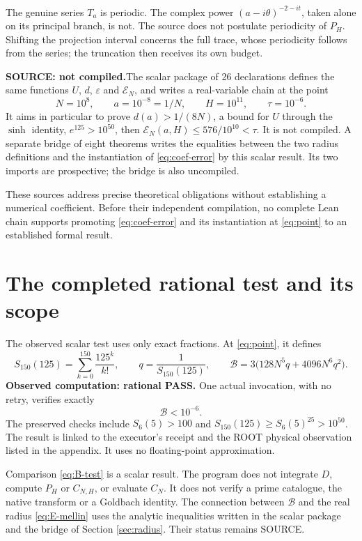 \documentclass[11pt,a4paper]{article}
\theoremstyle{remark}
\newcommand{\source}{\textbf{SOURCE: not compiled.}\space}
\begin{document}
The genuine series $T_a$ is periodic. The complex power
$(a-i\theta)^{-2-it}$, taken alone on its principal branch, is not.
The source does not postulate periodicity of $P_H$. Shifting the projection
interval concerns the full trace, whose periodicity follows from the series;
the truncation then receives its own budget.

\source The scalar package of 26 declarations defines the same functions
$U$, $d$, $\varepsilon$ and $\mathcal E_N$, and writes a real-variable
chain at the point
\begin{equation}\label{eq:point}
N=10^8,\qquad a=10^{-8}=1/N,\qquad H=10^{11},\qquad\tau=10^{-6}.
\end{equation}
It aims in particular to prove $d(a)>1/(8N)$, a bound for $U$ through the
$\sinh$ identity, $e^{125}>10^{50}$, then
$\mathcal E_N(a,H)\le576/10^{10}<\tau$.
It is not compiled. A separate bridge of eight theorems writes the equalities
between the two radius definitions and the instantiation of
\eqref{eq:coef-error} by this scalar result. Its two imports are prospective;
the bridge is also uncompiled.

These sources address precise theoretical obligations without establishing
a numerical coefficient. Before their independent compilation, no complete
Lean chain supports promoting \eqref{eq:coef-error} and its instantiation
at \eqref{eq:point} to an established formal result.

\clearpage
\section{The completed rational test and its scope}\label{sec:scalar-test}
The observed scalar test uses only exact fractions. At \eqref{eq:point},
it defines
\[
S_{150}(125)=\sum_{k=0}^{150}\frac{125^k}{k!},\qquad
q=\frac1{S_{150}(125)},\qquad
\mathcal B=3\bigl(128N^5q+4096N^6q^2\bigr).
\]
\textbf{Observed computation: rational PASS.} One actual invocation,
with no retry, verifies exactly
\begin{equation}\label{eq:B-test}
\mathcal B<10^{-6}.
\end{equation}
The preserved checks include
$S_6(5)>100$ and
$S_{150}(125)\ge S_6(5)^{25}>10^{50}$.
The result is linked to the executor's receipt and the ROOT physical
observation listed in the appendix. It uses no floating-point approximation.

Comparison \eqref{eq:B-test} is a scalar result. The program does not integrate
$D$, compute $P_H$ or $C_{N,H}$, or evaluate $C_N$. It does not verify a prime
catalogue, the native transform or a Goldbach identity. The connection between
$\mathcal B$ and the real radius \eqref{eq:E-mellin} uses the analytic
inequalities written in the scalar package and the bridge of Section
\ref{sec:radius}. Their status remains SOURCE.
\end{document}
